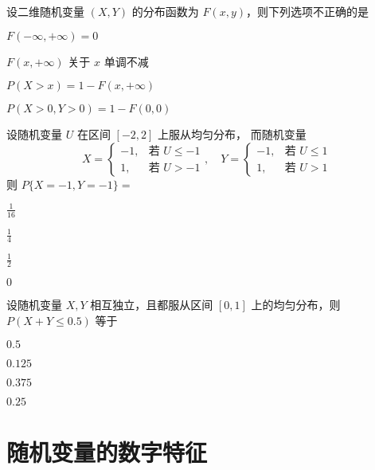 \documentclass{exam-zh}
\begin{document}
\begin{question}
  设二维随机变量 $(X, Y)$ 的分布函数为 $F(x, y)$，则下列选项不正确的是 \paren[D]
  \begin{choices}
    \item $F(-\infty, +\infty) = 0$  
    \item $F(x, +\infty)$ 关于 $x$ 单调不减  
    \item $P(X > x) = 1 - F(x, +\infty)$  
    \item $P(X > 0, Y > 0) = 1 - F(0, 0)$  
  \end{choices}
\end{question}

\begin{question}
  设随机变量 $U$ 在区间 $[-2,2]$ 上服从均匀分布，  
  而随机变量  
  $$X = \begin{cases} 
  -1, & \text{若 } U \leq -1 \\ 
  1, & \text{若 } U > -1
  \end{cases}, \quad Y = \begin{cases} 
  -1, & \text{若 } U \leq 1 \\ 
  1, & \text{若 } U > 1 
  \end{cases}$$  
  则  
  $P\{X=-1,Y=-1\} = $ \paren[B]
  \begin{choices}
    \item $\frac{1}{16}$  
    \item $\frac{1}{4}$  
    \item $\frac{1}{2}$  
    \item $0$  
  \end{choices}
\end{question}

\begin{question}
  设随机变量 $X, Y$ 相互独立，且都服从区间 $[0, 1]$ 上的均匀分布，则 $P(X + Y \leq 0.5)$ 等于 \paren[B]
  \begin{choices}
    \item $0.5$  
    \item $0.125$  
    \item $0.375$  
    \item $0.25$  
  \end{choices}
\end{question}

\section{随机变量的数字特征}
\end{document}
